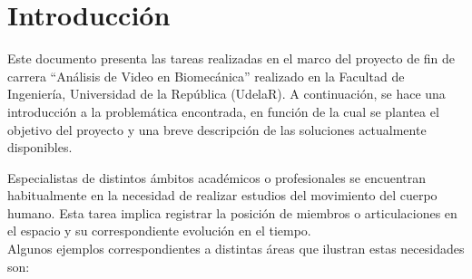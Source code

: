 \chapter{Introducción}

Este documento presenta las tareas realizadas en el marco del proyecto de fin de carrera ``Análisis de Video en Biomecánica'' realizado en la Facultad de Ingeniería, Universidad de la República (UdelaR). A continuación, se hace una introducción a la problemática encontrada, en función de la cual se plantea el objetivo del proyecto y una breve descripción de las soluciones actualmente disponibles.
\vspace{5 mm}

Especialistas de distintos ámbitos académicos o profesionales se encuentran habitualmente en la necesidad de realizar estudios del movimiento del cuerpo humano. Esta tarea implica registrar la posición de miembros o articulaciones en el espacio y su correspondiente evolución en el tiempo.
\\ 

Algunos ejemplos correspondientes a distintas áreas que ilustran estas necesidades son:

